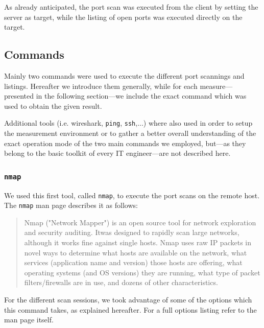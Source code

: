 \documentclass[10pt,a4paper,twoside,onecolumn]{article}
\begin{document}
As already anticipated, the port scan was executed from the client by setting the server as target, while the listing of open ports was executed directly on the target.

\subsection{Commands}

Mainly two commands were used to execute the different port scannings and listings. Hereafter we introduce them generally, while for each measure---presented in the following section---we include the exact command which was used to obtain the given result.

Additional tools (i.e. wireshark, \texttt{ping}, \texttt{ssh},...) where also used in order to setup the measurement environment or to gather a better overall understanding of the exact operation mode of the two main commands we employed, but---as they belong to the basic toolkit of every IT engineer---are not described here.

\subsubsection{\texttt{nmap}}

We used this first tool, called \texttt{nmap}, to execute the port scans on the remote host. The \texttt{nmap} man page describes it as follows:

\begin{quote}
	Nmap ("Network Mapper") is an open source tool for network exploration and security auditing.
	Itwas designed to rapidly scan large networks, although it works fine against single hosts.
	Nmap uses raw IP packets in novel ways to determine what hosts are available on the network, what services (application name and version) those hosts are offering, what operating systems (and OS versions) they are running, what type of packet filters/firewalls are in use, and dozens of other characteristics.
\end{quote}

For the different scan sessions, we took advantage of some of the options which this command takes, as explained hereafter. For a full options listing refer to the man page itself.

\end{document}
